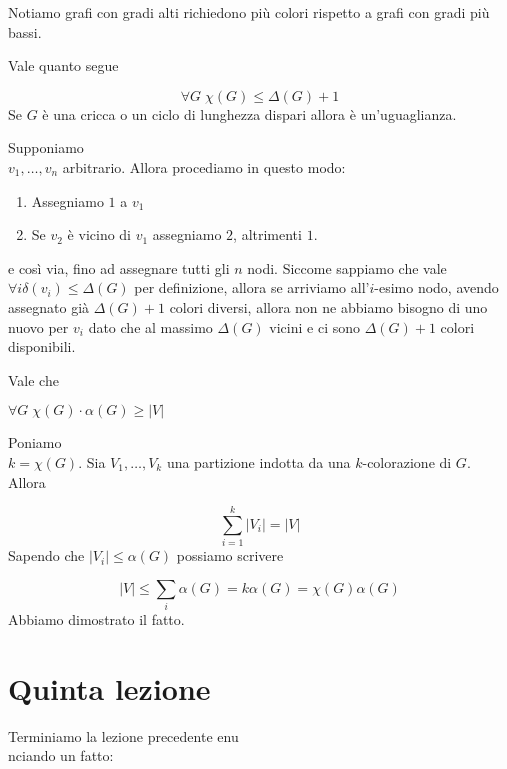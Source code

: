 \documentclass[12pt]{report}
\begin{document}
\noindent 
Notiamo grafi con gradi alti richiedono più colori rispetto a grafi con gradi più bassi. 

\begin{fatto} Vale quanto segue 

$$\forall G \; \chi(G) \leq \Delta(G) + 1$$
Se $G$ è una cricca o un ciclo di lunghezza dispari allora è un'uguaglianza.
\end{fatto}

\begin{dimo}
    Supponiamo \\ $v_1,\dots,v_n$ arbitrario. Allora procediamo in questo modo:

    \begin{enumerate}
        \item Assegniamo $1$ a $v_1$
        \item Se $v_2$ è vicino di $v_1$ assegniamo $2$, altrimenti $1$.
    \end{enumerate}
    e così via, fino ad assegnare tutti gli $n$ nodi. Siccome sappiamo che vale $\forall i \delta(v_i) \leq \Delta(G)$ per definizione, allora se arriviamo all'$i$-esimo nodo, avendo assegnato già $\Delta(G) + 1$ colori diversi, allora non ne abbiamo bisogno di uno nuovo per $v_i$ dato che al massimo $\Delta(G)$ vicini e ci sono $\Delta(G) + 1$ colori disponibili.
\end{dimo}

\begin{fatto}
    Vale che 

    $\forall G  \; \chi(G) \cdot \alpha(G) \geq |V|$
\end{fatto}

\begin{dimo}
    Poniamo \\ $k = \chi(G)$. Sia $V_1,\dots,V_k$ una partizione indotta da una $k$-colorazione di $G$. Allora

    $$\sum_{i = 1}^k |V_i|  = |V|$$
    Sapendo che $|V_i| \leq \alpha(G)$ possiamo scrivere

    $$|V| \leq \sum_i \alpha(G)  = k \alpha(G) = \chi(G) \alpha(G)$$ Abbiamo dimostrato il fatto.
\end{dimo}


\chapter{Quinta lezione}

\noindent
Terminiamo la lezione precedente enu\\nciando un fatto:
\end{document}
